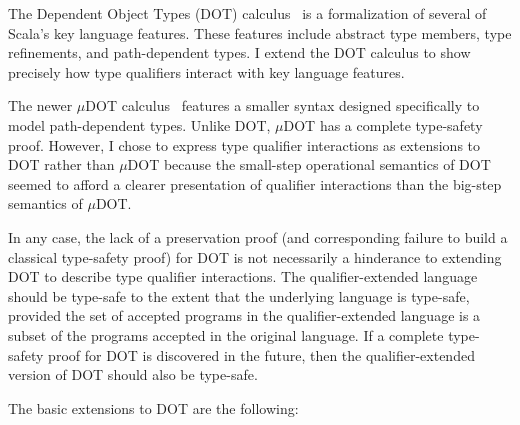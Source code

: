 




The Dependent Object Types (DOT) calculus~\cite{dot}
is a formalization of several of Scala's key language features.
These features include abstract type members, type refinements,
and path-dependent types.
I extend the DOT calculus to show precisely how type qualifiers
interact with key language features.

The newer \mbox{$\mu$DOT} calculus~\cite{udot}
features a smaller syntax designed specifically to model
path-dependent types.
Unlike DOT, \mbox{$\mu$DOT} has a complete type-safety proof.
However, I chose to express type qualifier interactions
as extensions to DOT rather than \mbox{$\mu$DOT} because the small-step operational
semantics of DOT seemed to afford a clearer presentation
of qualifier interactions than the big-step semantics of \mbox{$\mu$DOT}.

In any case, the lack of a preservation proof (and corresponding failure
to build a classical type-safety proof) for DOT is not necessarily a hinderance to
extending DOT to describe type qualifier interactions.
The qualifier-extended language should be type-safe to the extent that
the underlying language is type-safe,
provided the set of accepted programs in the qualifier-extended language
is a subset of the programs accepted in the original language.
If a complete type-safety proof for DOT is discovered in the future,
then the qualifier-extended version of DOT should also be type-safe.

The basic extensions to DOT are the following:

